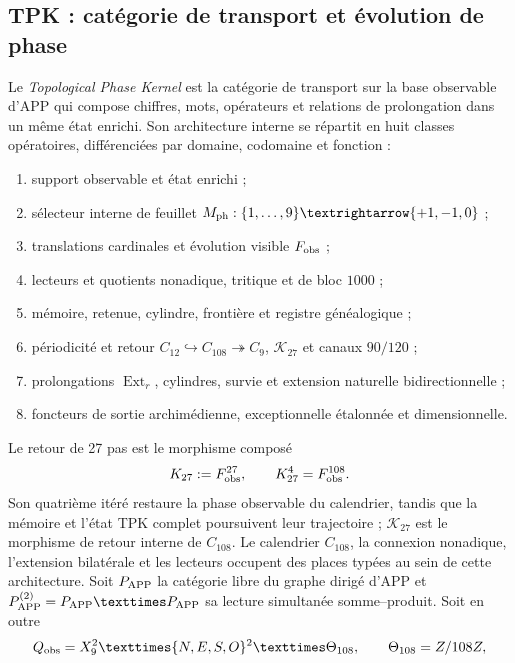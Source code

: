\subsection{TPK : catégorie de transport et évolution de phase}

Le \emph{Topological Phase Kernel} est la catégorie de transport sur la
base observable d'APP qui compose chiffres, mots, opérateurs et relations
de prolongation dans un même état enrichi. Son architecture interne se répartit en
huit classes opératoires, différenciées par domaine, codomaine et fonction :
\begin{enumerate}[label=\textup{(\roman*)},leftmargin=2.25em]
\item support observable et état enrichi ;
\item sélecteur interne de feuillet \(M_{\rm ph}:\{1,\ldots,9\}\to\{+1,-1,0\}\) ;
\item translations cardinales et évolution visible \(F_{\rm obs}\) ;
\item lecteurs et quotients nonadique, tritique et de bloc \(1000\) ;
\item mémoire, retenue, cylindre, frontière et registre généalogique ;
\item périodicité et retour
\(C_{12}\hookrightarrow C_{108}\twoheadrightarrow C_9\),
\(\mathcal K_{27}\) et canaux \(90/120\) ;
\item prolongations \(\operatorname{Ext}_r\), cylindres, survie et
extension naturelle bidirectionnelle ;
\item foncteurs de sortie archimédienne, exceptionnelle étalonnée et dimensionnelle.
\end{enumerate}
Le retour de 27 pas est le morphisme composé
\begin{equation}
\mathcal K_{27}:=F_{\rm obs}^{27},
\qquad \mathcal K_{27}^{4}=F_{\rm obs}^{108}.
\label{p12-83-c3-s1:eq:tpk-kernel-27}
\end{equation}
Son quatrième itéré restaure la phase observable du calendrier, tandis que la
mémoire et l'état TPK complet poursuivent leur trajectoire ;
\(\mathcal K_{27}\) est le morphisme de retour interne de \(C_{108}\).
Le calendrier \(C_{108}\), la connexion nonadique, l'extension bilatérale et
les lecteurs occupent des places typées au sein de cette architecture. Soit
\(\mathsf P_{\rm APP}\) la catégorie
libre du graphe dirigé d'APP et
\(\mathsf P_{\rm APP}^{(2)}=\mathsf P_{\rm APP}\times
\mathsf P_{\rm APP}\) sa lecture simultanée somme--produit. Soit en outre
\[
\mathcal Q_{\rm obs}
=X_9^2\times\{N,E,S,O\}^2\times\Theta_{108},
\qquad \Theta_{108}=\mathbb Z/108\mathbb Z,
\]
